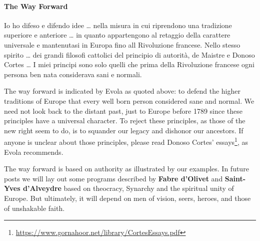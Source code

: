 \paragraph{The Way Forward}
\begin{quotex}
Io ho difeso e difendo idee … nella misura in cui riprendono una tradizione superiore e anteriore … in quanto appartengono al retaggio della carattere universale e mantenutasi in Europa fino all Rivoluzione francese. Nello stesso spirito … dei grandi filosofi cattolici del principio di autorità, de Maistre e Donoso Cortes … I miei principi sono solo quelli che prima della Rivoluzione francese ogni persona ben nata considerava sani e normali.

\end{quotex}
The way forward is indicated by Evola as quoted above: to defend the higher traditions of Europe that every well born person considered sane and normal. We need not look back to the distant past, just to Europe before 1789 since these principles have a universal character. To reject these principles, as those of the new right seem to do, is to squander our legacy and dishonor our ancestors. If anyone is unclear about those principles, please read Donoso Cortes’ essays\footnote{\url{https://www.gornahoor.net/library/CortesEssays.pdf}}, as Evola recommends.

The way forward is based on authority as illustrated by our examples. In future posts we will lay out some programs described by \textbf{Fabre d'Olivet} and \textbf{Saint-Yves d'Alveydre} based on theocracy, Synarchy and the spiritual unity of Europe. But ultimately, it will depend on men of vision, seers, heroes, and those of unshakable faith.

